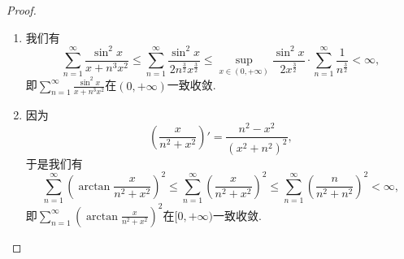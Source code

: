 \documentclass[../../main.tex]{subfiles}%
\begin{document}
\begin{proof}
\begin{enumerate}
\item 我们有
\[
\sum_{n=1}^{\infty} \frac{\sin^2 x}{x + n^3 x^2} \leqslant \sum_{n=1}^{\infty} \frac{\sin^2 x}{2n^{\frac{3}{2}} x^{\frac{3}{2}}} \leqslant \sup_{x \in (0, +\infty)} \frac{\sin^2 x}{2x^{\frac{3}{2}}} \cdot \sum_{n=1}^{\infty} \frac{1}{n^{\frac{3}{2}}} < \infty,
\]
即\(\sum_{n=1}^{\infty} \frac{\sin^2 x}{x + n^3 x^2}\)在\((0, +\infty)\)一致收敛.

\item 因为
\[
\left( \frac{x}{n^2 + x^2} \right)' = \frac{n^2 - x^2}{(x^2 + n^2)^2},
\]
于是我们有
\[
\sum_{n=1}^{\infty} \left( \arctan \frac{x}{n^2 + x^2} \right)^2 \leqslant \sum_{n=1}^{\infty} \left( \frac{x}{n^2 + x^2} \right)^2 \leqslant \sum_{n=1}^{\infty} \left( \frac{n}{n^2 + n^2} \right)^2 < \infty,
\]
即\(\sum_{n=1}^{\infty} \left( \arctan \frac{x}{n^2 + x^2} \right)^2\)在\([0, +\infty)\)一致收敛.
\end{enumerate}
\end{proof}
\end{document}
